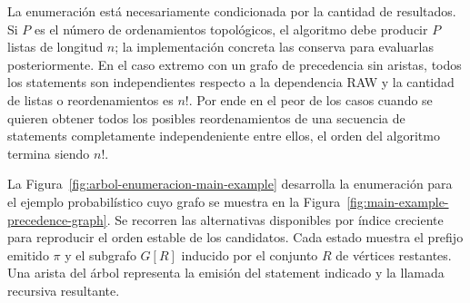 La enumeración está necesariamente condicionada por la cantidad de resultados. Si $P$ es el número de ordenamientos topológicos, el algoritmo debe producir $P$ listas de longitud $n$; la implementación concreta las conserva para evaluarlas posteriormente. En el caso extremo con un grafo de precedencia sin aristas, todos los statements son independientes respecto a la dependencia RAW y la cantidad de listas o reordenamientos es $n!$. Por ende en el peor de los casos cuando se quieren obtener todos los posibles reordenamientos de una secuencia de statements completamente independeniente entre ellos, el orden del algoritmo termina siendo $n!$.  

La Figura~\ref{fig:arbol-enumeracion-main-example} desarrolla la enumeración para el ejemplo probabilístico cuyo grafo se muestra en la Figura~\ref{fig:main-example-precedence-graph}. Se recorren las alternativas disponibles por índice creciente para reproducir el orden estable de los candidatos. Cada estado muestra el prefijo emitido $\pi$ y el subgrafo $G[R]$ inducido por el conjunto $R$ de vértices restantes. Una arista del árbol representa la emisión del statement indicado y la llamada recursiva resultante.

